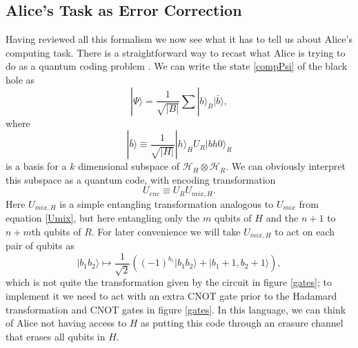 \documentclass[12pt]{article}
\newcommand{\be}{\begin{equation}}
\newcommand{\ee}{\end{equation}}
\newcommand{\HH}{\mathcal{H}_H}
\newcommand{\HR}{\mathcal{H}_R}
\newcommand{\ran}{\rangle}
\begin{document}
\subsection{Alice's Task as Error Correction}
Having reviewed all this formalism we now see what it has to tell us about Alice's computing task.  There is a straightforward way to recast what Alice is trying to do as a quantum coding problem \cite{HaydenPreskill}.  We can write the state \eqref{compPsi} of the black hole as
\be
|\Psi\ran=\frac{1}{\sqrt{|B|}}\sum |b\ran_B |\bar{b}\ran,
\ee
where 
\be\label{bhcode}
|\bar{b}\ran \equiv \frac{1}{\sqrt{|H|}} |h\ran_H U_R |bh0\ran_R
\ee
is a basis for a $k$ dimensional subspace of $\HH\otimes\HR$.  We can obviously interpret this subspace as a quantum code, with encoding transformation
\be\label{bhenc}
U_{enc}\equiv U_{R}U_{mix,H}.
\ee
Here $U_{mix,H}$ is a simple entangling transformation analogous to $U_{mix}$ from equation \eqref{Umix}, but here entangling only  the $m$ qubits of $H$ and the $n+1$ to $n+m$th qubits of $R$.  For later convenience we will take $U_{mix,H}$ to act on each pair of qubits as
\be\label{entangler2}
|b_1b_2\ran\mapsto \frac{1}{\sqrt{2}}\left((-1)^{b_1}|b_1b_2\ran+|b_1+1,b_2+1\ran\right),
\ee
which is not quite the transformation given by the circuit in figure \ref{gates}; to implement it we need to act with an extra CNOT gate prior to the Hadamard transformation and CNOT gates in figure \ref{gates}.  In this language, we can think of Alice not having access to $H$ as putting this code through an erasure channel that erases all qubits in $H$.  
\end{document}
